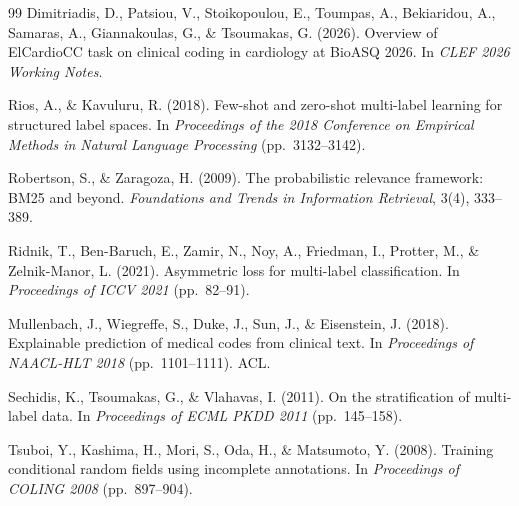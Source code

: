 \begin{thebibliography}{99}
Dimitriadis, D., Patsiou, V., Stoikopoulou, E., Toumpas, A., Bekiaridou, A., Samaras, A., Giannakoulas, G., \& Tsoumakas, G. (2026).
Overview of ElCardioCC task on clinical coding in cardiology at BioASQ 2026.
In \textit{CLEF 2026 Working Notes}.

Rios, A., \& Kavuluru, R. (2018).
Few-shot and zero-shot multi-label learning for structured label spaces.
In \textit{Proceedings of the 2018 Conference on Empirical Methods in Natural Language
Processing} (pp.\ 3132--3142).

Robertson, S., \& Zaragoza, H. (2009).
The probabilistic relevance framework: BM25 and beyond.
\textit{Foundations and Trends in Information Retrieval}, 3(4), 333--389.

Ridnik, T., Ben-Baruch, E., Zamir, N., Noy, A., Friedman, I., Protter, M., \& Zelnik-Manor, L. (2021).
Asymmetric loss for multi-label classification.
In \textit{Proceedings of ICCV 2021} (pp.\ 82--91).

Mullenbach, J., Wiegreffe, S., Duke, J., Sun, J., \& Eisenstein, J. (2018).
Explainable prediction of medical codes from clinical text.
In \textit{Proceedings of NAACL-HLT 2018} (pp.\ 1101--1111). ACL.

Sechidis, K., Tsoumakas, G., \& Vlahavas, I. (2011).
On the stratification of multi-label data.
In \textit{Proceedings of ECML PKDD 2011} (pp.\ 145--158).

Tsuboi, Y., Kashima, H., Mori, S., Oda, H., \& Matsumoto, Y. (2008).
Training conditional random fields using incomplete annotations.
In \textit{Proceedings of COLING 2008} (pp.\ 897--904).

\end{thebibliography}
